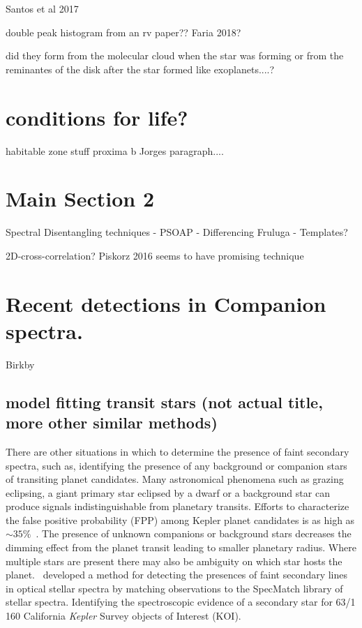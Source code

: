 Santos et al 2017 


double peak histogram from an rv paper?? Faria 2018?


did they form from the molecular cloud when the star was forming or from the reminantes of the disk after the star formed like exoplanets....?


\section{ conditions for life?}
habitable zone stuff
proxima b
Jorges paragraph.... 

\section{Main Section 2}


Spectral Disentangling techniques
- PSOAP
- Differencing Fruluga
- Templates?


2D-cross-correlation?   Piskorz 2016 seems to have promising technique


\section{Recent detections in Companion spectra.}

Birkby


\subsection{model fitting transit stars (not actual title, more other similar methods)}
There are other situations in which to determine the presence of faint secondary spectra, such as, identifying the presence of any background or companion stars of transiting planet candidates. Many astronomical phenomena such as grazing eclipsing, a giant primary star eclipsed by a dwarf or a background star can produce signals indistinguishable from planetary transits. Efforts to characterize the false positive probability (FPP) among Kepler planet candidates is as high as $\sim35\%$~\citep{santerne_sophie_2012}. The presence of unknown companions or background stars decreases the dimming effect from the planet transit leading to smaller planetary radius. Where multiple stars are present there may also be ambiguity on which star hosts the planet.~\citet{kolbl_detection_2015} developed a method for detecting the presences of faint secondary lines in optical stellar spectra by matching observations to the SpecMatch library of stellar spectra. Identifying the spectroscopic evidence of a secondary star for 63/1\,160 California \emph{Kepler} Survey objects of Interest (KOI).


